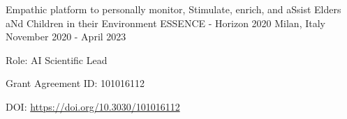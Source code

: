 \begin{cventries}
    \vspace{2mm}
    \cventry
        {Empathic platform to personally monitor, Stimulate, enrich, and aSsist Elders aNd Children in their Environment}
        {ESSENCE - Horizon 2020}
        {Milan, Italy}
        {November 2020 - April 2023}
        {
        \begin{cvitems}
            \item {Role: AI Scientific Lead}
            \item {Grant Agreement ID: 101016112}
            \item {DOI: \url{https://doi.org/10.3030/101016112}}
        \end{cvitems}
        }


\end{cventries}